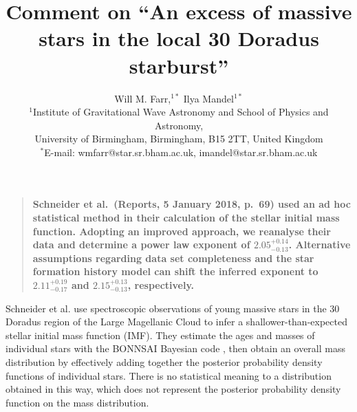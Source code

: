 \documentclass[12pt]{article}
\title{Comment on ``An excess of massive stars in the local 30 Doradus starburst''}
\author{Will M. Farr,$^{1\ast}$ Ilya Mandel$^{1\ast}$\\
\normalsize{$^1$Institute of Gravitational Wave Astronomy and School of Physics and Astronomy,}\\
\normalsize{University of Birmingham, Birmingham, B15 2TT, United Kingdom}\\
\normalsize{$^\ast$E-mail: wmfarr@star.sr.bham.ac.uk, imandel@star.sr.bham.ac.uk}
}
\date{}
\newenvironment{sciabstract}{%
\begin{quote} \bf}
{\end{quote}}
\newcommand{\onesigrange}[3]{\ensuremath{#1^{+#2}_{-#3}}}
\newcommand{\alpharangeone}{\onesigrange{2.05}{0.14}{0.13}}
\newcommand{\alpharangethree}{\onesigrange{2.11}{0.19}{0.17}}
\newcommand{\alpharangefour}{\onesigrange{2.15}{0.13}{0.13}}
\begin{document}

\baselineskip24pt


\maketitle



\begin{sciabstract}
%
%
Schneider et al.~(Reports, 5 January 2018, p.~69) used an ad hoc statistical method in their calculation of the stellar initial mass function. Adopting an improved approach, we reanalyse their data and determine a power law exponent of $\alpharangeone$. Alternative assumptions regarding data set completeness and the star formation history model can shift the inferred exponent to $\alpharangethree$ and $\alpharangefour$, respectively.
\end{sciabstract}


Schneider et al.\cite{Schneider:2018} use spectroscopic observations of young massive stars in
the 30 Doradus region of the Large Magellanic Cloud to infer a
shallower-than-expected stellar initial mass function (IMF).  They estimate the ages and masses of individual
stars with the BONNSAI Bayesian code \cite{Schneider:2017}, then obtain
an overall mass distribution by effectively adding together the posterior
probability density functions of individual stars.  There is no statistical
meaning to a distribution obtained in this way, which does not represent the
posterior probability density function on the mass distribution.
\end{document}
